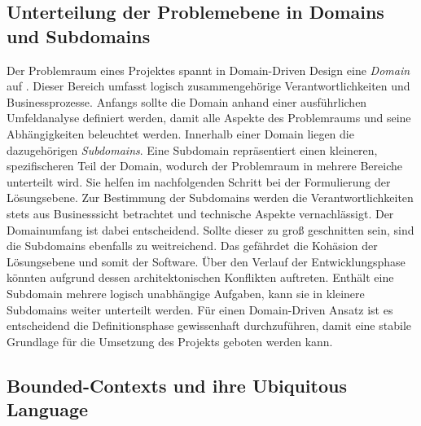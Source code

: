\subsection{Unterteilung der Problemebene in Domains und Subdomains}

Der Problemraum eines Projektes spannt in Domain-Driven Design eine \emph{Domain} auf \cite[S. 56]{Vernon.2015}. Dieser Bereich umfasst logisch zusammengehörige Verantwortlichkeiten und Businessprozesse. Anfangs sollte die Domain anhand einer ausführlichen Umfeldanalyse definiert werden, damit alle Aspekte des Problemraums und seine Abhängigkeiten beleuchtet werden. Innerhalb einer Domain liegen die dazugehörigen \emph{Subdomains}. Eine Subdomain repräsentiert einen kleineren, spezifischeren Teil der Domain, wodurch der Problemraum in mehrere Bereiche unterteilt wird. Sie helfen im nachfolgenden Schritt bei der Formulierung der Lösungsebene. Zur Bestimmung der Subdomains werden die Verantwortlichkeiten stets aus Businesssicht betrachtet und technische Aspekte vernachlässigt. Der Domainumfang ist dabei entscheidend. Sollte dieser zu groß geschnitten sein, sind die Subdomains ebenfalls zu weitreichend. Das gefährdet die Kohäsion der Lösungsebene und somit der Software. Über den Verlauf der Entwicklungsphase könnten aufgrund dessen architektonischen Konflikten auftreten. Enthält eine Subdomain mehrere logisch unabhängige Aufgaben, kann sie in kleinere Subdomains weiter unterteilt werden. Für einen Domain-Driven Ansatz ist es entscheidend die Definitionsphase gewissenhaft durchzuführen, damit eine stabile Grundlage für die Umsetzung des Projekts geboten werden kann. 

\subsection{Bounded-Contexts und ihre Ubiquitous Language}

